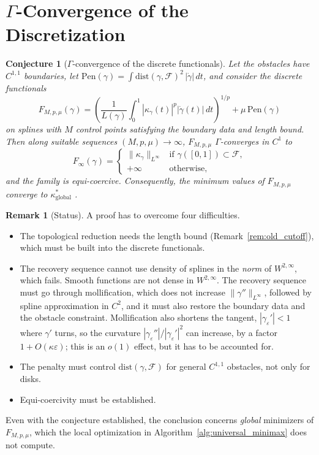 \documentclass[11pt,reqno]{amsart}
\newtheorem{conjecture}[theorem]{Conjecture}
\theoremstyle{definition}
\newtheorem{remark}[theorem]{Remark}
\newcommand{\dist}{\mathrm{dist}}
\numberwithin{equation}{section}
\begin{document}
\section{\texorpdfstring{$\Gamma$}{Gamma}-Convergence of the Discretization}
\label{sec:gamma_convergence}

\begin{conjecture}[$\Gamma$-convergence of the discrete functionals]
\label{thm:gamma_convergence}
Let the obstacles have $C^{1,1}$ boundaries, let $\mathrm{Pen}(\gamma) = \int \dist(\gamma, \mathcal{F})^2\,|\dot\gamma|\,dt$, and consider the discrete functionals
\begin{equation}
F_{M, p, \mu}(\gamma) = \left( \frac{1}{L(\gamma)} \int_0^1 |\kappa_\gamma(t)|^p |\dot{\gamma}(t)|\,dt \right)^{1/p} + \mu\, \mathrm{Pen}(\gamma)
\end{equation}
on splines with $M$ control points satisfying the boundary data and length bound. Then along suitable sequences $(M, p, \mu) \to \infty$, $F_{M,p,\mu}$ $\Gamma$-converges in $C^1$ to
\begin{equation}
F_\infty(\gamma) = \begin{cases}
\|\kappa_\gamma\|_{L^\infty} & \text{if } \gamma([0, 1]) \subset \mathcal{F}, \\
+\infty & \text{otherwise,}
\end{cases}
\end{equation}
and the family is equi-coercive. Consequently, the minimum values of $F_{M,p,\mu}$ converge to $\kappa^*_{\mathrm{global}}$ \cite{braides2002}.
\end{conjecture}

\begin{remark}[Status]
A proof has to overcome four difficulties.
\begin{itemize}
    \item The topological reduction needs the length bound (Remark~\ref{rem:old_cutoff}), which must be built into the discrete functionals.
    \item The recovery sequence cannot use density of splines in the \emph{norm} of $W^{2,\infty}$, which fails. Smooth functions are not dense in $W^{2,\infty}$. The recovery sequence must go through mollification, which does not increase $\|\gamma''\|_{L^\infty}$, followed by spline approximation in $C^2$, and it must also restore the boundary data and the obstacle constraint. Mollification also shortens the tangent, $|\gamma_\varepsilon'| < 1$ where $\gamma'$ turns, so the curvature $|\gamma_\varepsilon''|/|\gamma_\varepsilon'|^2$ can increase, by a factor $1 + O(\kappa\varepsilon)$; this is an $o(1)$ effect, but it has to be accounted for.
    \item The penalty must control $\dist(\gamma, \mathcal{F})$ for general $C^{1,1}$ obstacles, not only for disks.
    \item Equi-coercivity must be established.
\end{itemize}
Even with the conjecture established, the conclusion concerns \emph{global} minimizers of $F_{M,p,\mu}$, which the local optimization in Algorithm~\ref{alg:universal_minimax} does not compute.
\end{remark}
\end{document}

